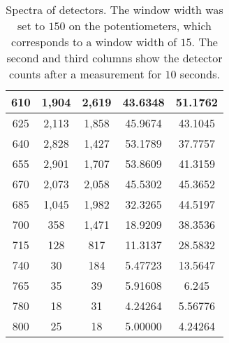 \documentclass{article}
\begin{document}
\begin{table}
\begin{tabular}{|*{5}{c|}}
610 & 	1,904 & 2,619 & 43.6348 & 51.1762 \\ \hline 
625 & 	2,113 & 1,858 & 45.9674 & 43.1045 \\ \hline 
640 & 	2,828 & 1,427 & 53.1789 & 37.7757 \\ \hline 
655 & 	2,901 & 1,707 & 53.8609 & 41.3159 \\ \hline 
670 & 	2,073 & 2,058 & 45.5302 & 45.3652 \\ \hline 
685 & 	1,045 & 1,982 & 32.3265 & 44.5197 \\ \hline 
700 & 	  358 & 1,471 & 18.9209 & 38.3536 \\ \hline 
715 & 	  128 &   817 & 11.3137 & 28.5832 \\ \hline 
740 & 	   30 &   184 & 5.47723 & 13.5647 \\ \hline 
765 & 	   35 &    39 & 5.91608 & 6.245 \\ \hline 
780 & 18 & 31 & 4.24264 & 5.56776 \\ \hline 
800 & 25 & 18 & 5.00000 & 4.24264 \\ \hline 
\end{tabular} 
\caption{Spectra of detectors. The window width was set to $150$ on the potentiometers, which corresponds to a window width of $15$. The second and third columns show the detector counts after a measurement for $10$ seconds.}
\end{table}
\end{document}
